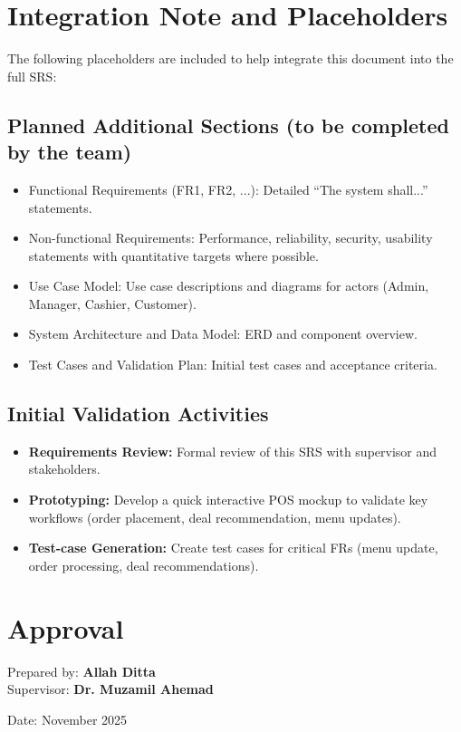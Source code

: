 \documentclass[12pt,a4paper]{article}
\begin{document}
\section{Integration Note and Placeholders}
The following placeholders are included to help integrate this document into the full SRS:

\subsection{Planned Additional Sections (to be completed by the team)}
\begin{itemize}
    \item Functional Requirements (FR1, FR2, ...): Detailed ``The system shall...'' statements.
    \item Non-functional Requirements: Performance, reliability, security, usability statements with quantitative targets where possible.
    \item Use Case Model: Use case descriptions and diagrams for actors (Admin, Manager, Cashier, Customer).
    \item System Architecture and Data Model: ERD and component overview.
    \item Test Cases and Validation Plan: Initial test cases and acceptance criteria.
\end{itemize}

\subsection{Initial Validation Activities}
\begin{itemize}
    \item \textbf{Requirements Review:} Formal review of this SRS with supervisor and stakeholders.
    \item \textbf{Prototyping:} Develop a quick interactive POS mockup to validate key workflows (order placement, deal recommendation, menu updates).
    \item \textbf{Test-case Generation:} Create test cases for critical FRs (menu update, order processing, deal recommendations).
\end{itemize}

\section{Approval}
\vspace{1em}
\noindent Prepared by: \textbf{Allah Ditta} \\
\noindent Supervisor: \textbf{Dr. Muzamil Ahemad} \\
\vspace{2em}

\noindent Date: November 2025
\end{document}
